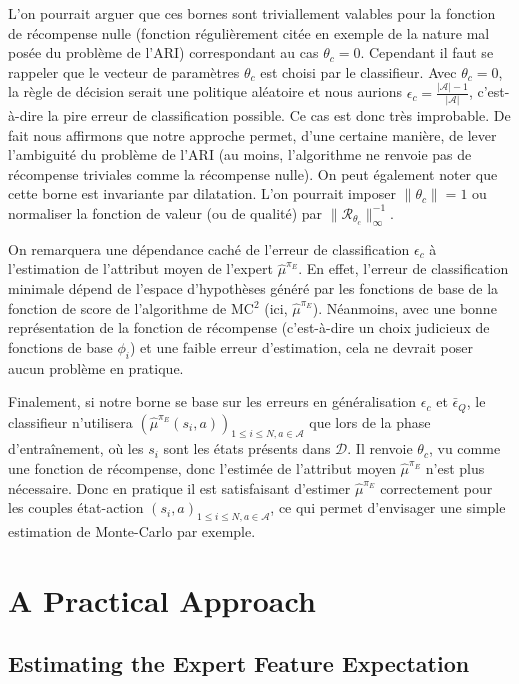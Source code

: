 \documentclass[english,utf8]{./hermes-journal}
\newcommand{\R}{\mathcal{R}}
\newcommand{\A}{\mathcal{A}}
\newcommand{\D}{\mathcal{D}}
\begin{document}
L'on pourrait arguer que ces bornes sont triviallement valables pour la fonction de récompense nulle (fonction régulièrement citée en exemple de la nature mal posée du problème de l'ARI) correspondant au cas $\theta_c=0$. Cependant il faut se rappeler que le vecteur de paramètres $\theta_c$ est choisi par le classifieur. Avec 
$\theta_c=0$, la règle de décision serait une politique aléatoire et nous aurions $\epsilon_c = \frac{|\A|-1}{|\A|}$, c'est-à-dire la pire erreur de classification possible. Ce cas est donc très improbable. De fait nous affirmons que notre approche permet, d'une certaine manière, de lever l'ambiguité du problème de l'ARI (au moins, l'algorithme ne renvoie pas de récompense triviales comme la récompense nulle).
%
On peut également noter que cette borne est invariante par dilatation. L'on pourrait imposer 
$\|\theta_c\|=1$ ou normaliser la fonction de valeur (ou de qualité) par 
$\|\R_{\theta_c}\|_\infty^{-1}$.

On remarquera une dépendance caché de l'erreur de classification  $\epsilon_c$ à l'estimation de l'attribut moyen de l'expert  $\hat{\mu}^{\pi_E}$. En effet, l'erreur de classification minimale dépend de l'espace d'hypothèses généré par les fonctions de base de la fonction de score de l'algorithme de MC$^2$ (ici, 
$\hat{\mu}^{\pi_E}$). Néanmoins, avec une bonne représentation de la fonction de récompense (c'est-à-dire un choix judicieux de fonctions de base $\phi_i$) et une faible erreur d'estimation, cela ne devrait poser aucun problème en pratique.

Finalement, si notre borne se base sur les erreurs en généralisation 
$\epsilon_c$ et $\bar{\epsilon}_Q$, le classifieur n'utilisera 
$(\hat{\mu}^{\pi_E}(s_i,a))_{1\leq i\leq N,a\in\A}$ que lors de la phase d'entraînement, où les $s_i$ sont les états présents dans $\D$. Il renvoie 
$\theta_c$, vu comme une fonction de récompense, donc l'estimée de l'attribut moyen $\hat{\mu}^{\pi_E}$ n'est plus nécessaire. Donc en pratique il est satisfaisant d'estimer 
$\hat{\mu}^{\pi_E}$ correctement pour les couples état-action $(s_i,a)_{1\leq i\leq
N,a\in\A}$, ce qui permet d'envisager une simple estimation de Monte-Carlo par exemple.

\section{A Practical Approach}
\label{sec:practicalApproach}

\subsection{Estimating the Expert Feature Expectation}
\label{subsec:practicalApproach:muE}
\end{document}
